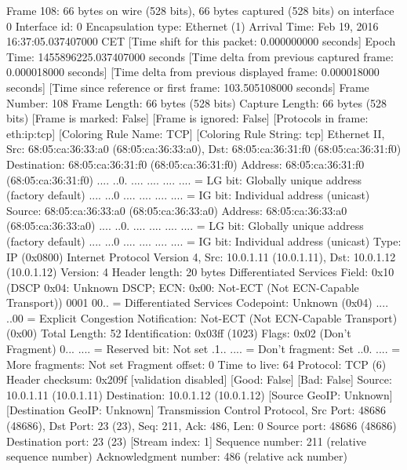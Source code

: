 Frame 108: 66 bytes on wire (528 bits), 66 bytes captured (528 bits) on interface 0
    Interface id: 0
    Encapsulation type: Ethernet (1)
    Arrival Time: Feb 19, 2016 16:37:05.037407000 CET
    [Time shift for this packet: 0.000000000 seconds]
    Epoch Time: 1455896225.037407000 seconds
    [Time delta from previous captured frame: 0.000018000 seconds]
    [Time delta from previous displayed frame: 0.000018000 seconds]
    [Time since reference or first frame: 103.505108000 seconds]
    Frame Number: 108
    Frame Length: 66 bytes (528 bits)
    Capture Length: 66 bytes (528 bits)
    [Frame is marked: False]
    [Frame is ignored: False]
    [Protocols in frame: eth:ip:tcp]
    [Coloring Rule Name: TCP]
    [Coloring Rule String: tcp]
Ethernet II, Src: 68:05:ca:36:33:a0 (68:05:ca:36:33:a0), Dst: 68:05:ca:36:31:f0 (68:05:ca:36:31:f0)
    Destination: 68:05:ca:36:31:f0 (68:05:ca:36:31:f0)
        Address: 68:05:ca:36:31:f0 (68:05:ca:36:31:f0)
        .... ..0. .... .... .... .... = LG bit: Globally unique address (factory default)
        .... ...0 .... .... .... .... = IG bit: Individual address (unicast)
    Source: 68:05:ca:36:33:a0 (68:05:ca:36:33:a0)
        Address: 68:05:ca:36:33:a0 (68:05:ca:36:33:a0)
        .... ..0. .... .... .... .... = LG bit: Globally unique address (factory default)
        .... ...0 .... .... .... .... = IG bit: Individual address (unicast)
    Type: IP (0x0800)
Internet Protocol Version 4, Src: 10.0.1.11 (10.0.1.11), Dst: 10.0.1.12 (10.0.1.12)
    Version: 4
    Header length: 20 bytes
    Differentiated Services Field: 0x10 (DSCP 0x04: Unknown DSCP; ECN: 0x00: Not-ECT (Not ECN-Capable Transport))
        0001 00.. = Differentiated Services Codepoint: Unknown (0x04)
        .... ..00 = Explicit Congestion Notification: Not-ECT (Not ECN-Capable Transport) (0x00)
    Total Length: 52
    Identification: 0x03ff (1023)
    Flags: 0x02 (Don't Fragment)
        0... .... = Reserved bit: Not set
        .1.. .... = Don't fragment: Set
        ..0. .... = More fragments: Not set
    Fragment offset: 0
    Time to live: 64
    Protocol: TCP (6)
    Header checksum: 0x209f [validation disabled]
        [Good: False]
        [Bad: False]
    Source: 10.0.1.11 (10.0.1.11)
    Destination: 10.0.1.12 (10.0.1.12)
    [Source GeoIP: Unknown]
    [Destination GeoIP: Unknown]
Transmission Control Protocol, Src Port: 48686 (48686), Dst Port: 23 (23), Seq: 211, Ack: 486, Len: 0
    Source port: 48686 (48686)
    Destination port: 23 (23)
    [Stream index: 1]
    Sequence number: 211    (relative sequence number)
    Acknowledgment number: 486    (relative ack number)
